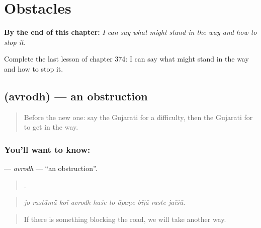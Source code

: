 
\chapter{Obstacles}
\label{ch:gu-obstacles}

\begin{chapteropening}
\textbf{By the end of this chapter:} \emph{I can say what might stand in the way and how to stop it.}

Complete the last lesson of chapter 374: I can say what might stand in the way and how to stop it.
\end{chapteropening}

\section[\texorpdfstring{\gu{અવરોધ} (avrodh)}{અવરોધ (avrodh)}]{ (avrodh) — an obstruction}

\label{lesson:GU-C374-avrodh}



\begin{quote}
Before the new one: say the Gujarati for a difficulty, then the Gujarati for to get in the way.
\end{quote}

\subsection*{You'll want to know: }
\textbf{} — \emph{avrodh} — \textquotedblleft{}an obstruction\textquotedblright{}.

\begin{quote}
         .
\end{quote}

\begin{quote}
\emph{jo rastāmā̃ koī avrodh haśe to āpaṇe bījā raste jaīśũ.}
\end{quote}

\begin{quote}
If there is something blocking the road, we will take another way.
\end{quote}

